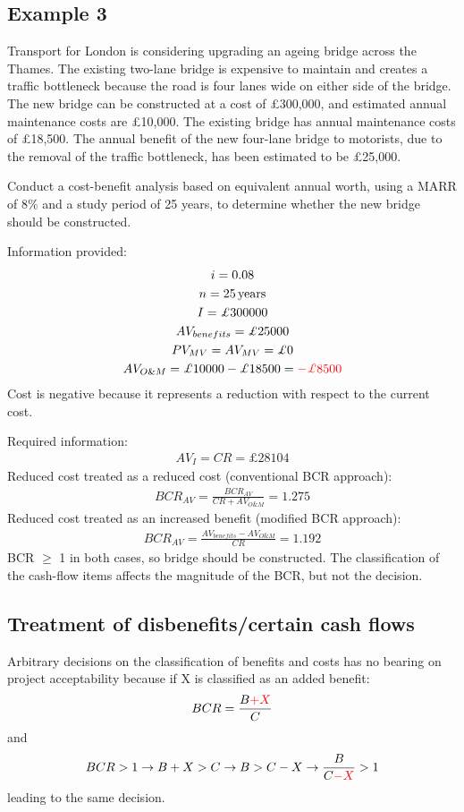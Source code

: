 \subsection{Example 3}
Transport for London is considering upgrading an ageing bridge across the Thames. The existing two-lane bridge is expensive to maintain and creates a traffic bottleneck because the road is four lanes wide on either side of the bridge. The new bridge can be constructed at a cost of \pounds 300,000, and estimated annual maintenance costs are \pounds 10,000. The existing bridge has annual maintenance costs of \pounds 18,500. The annual benefit of the new four-lane bridge to motorists, due to the removal of the traffic bottleneck, has been estimated to be \pounds 25,000.

Conduct a cost-benefit analysis based on equivalent annual worth, using a MARR of 8\% and a study period of 25 years, to determine whether the new bridge should be constructed.

Information provided:
\begin{gather}
  i = 0.08\\
  n = 25\, \textrm{years}\\
  I = \pounds 300000\\
  AV_{benefits} = \pounds 25000\\
  PV_{MV} = AV_{MV} = \pounds 0\\
  AV_{O\&M} = \pounds 10000 - \pounds 18500 = \textcolor{red}{-\pounds 8500}
\end{gather}
Cost is negative because it represents a reduction with respect to the current cost.

Required information:
\begin{gather}
  AV_I = CR = \pounds 28104
\end{gather}
Reduced cost treated as a reduced cost (conventional BCR approach):
\begin{gather}
  BCR_{AV} = \frac{BCR_{AV}}{CR + AV_{O\&M}} = 1.275
\end{gather}
Reduced cost treated as an increased benefit (modified BCR approach):
\begin{gather}
  BCR_{AV} = \frac{AV_{benefits} - AV_{O\&M}}{CR} = 1.192
\end{gather}
BCR $\geq$ 1 in both cases, so bridge should be constructed. The classification of the cash-flow items affects the magnitude of the BCR, but not the decision.
\subsection{Treatment of disbenefits/certain cash flows}
Arbitrary decisions on the classification of benefits and costs has no bearing on project acceptability because if X is classified as an added benefit:
\begin{gather}
  BCR = \frac{B \textcolor{red}{+ X }}{C}
\end{gather}
and
\begin{gather}
  BCR > 1 \rightarrow B + X > C \rightarrow B > C - X \rightarrow \frac{B}{C \textcolor{red}{- X}} > 1
\end{gather}
leading to the same decision.
